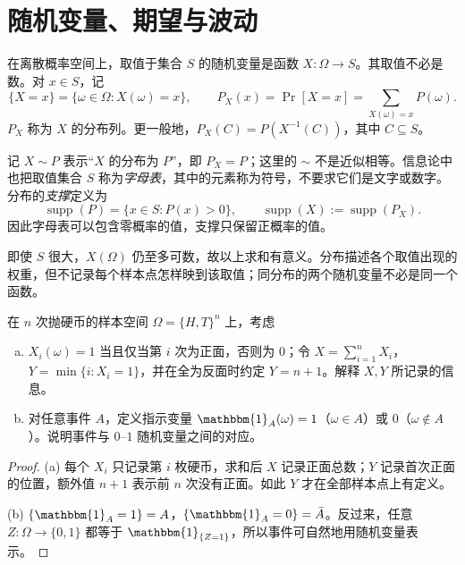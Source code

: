 \documentclass[lang=cn,a4paper,fontset=none,zihao=false,10pt,openany,twoside]{beautybook}
\numberwithin{algorithm}{chapter}
\begin{document}
\clearpage
\section{随机变量、期望与波动}\label{sec:probability-variables}
\begin{definition}[随机变量及其分布]\label{def:discrete-random-variable}
在离散概率空间上，取值于集合 $S$ 的随机变量是函数 $X:\Omega\to S$。其取值不必是数。对 $x\in S$，记
\[
 \{X=x\}=\{\omega\in\Omega:X(\omega)=x\},\qquad
 P_X(x)=\Pr[X=x]=\sum_{X(\omega)=x}P(\omega).
\]
$P_X$ 称为 $X$ 的分布列。更一般地，$P_X(C)=P(X^{-1}(C))$，其中 $C\subseteq S$。
\end{definition}
记 $X\sim P$ 表示“$X$ 的分布为 $P$”，即 $P_X=P$；这里的 $\sim$ 不是近似相等。信息论中也把取值集合 $S$ 称为\emph{字母表}，其中的元素称为符号，不要求它们是文字或数字。分布的\emph{支撑}定义为
\[
 \operatorname{supp}(P)=\{x\in S:P(x)>0\},\qquad
 \operatorname{supp}(X):=\operatorname{supp}(P_X).
\]
因此字母表可以包含零概率的值，支撑只保留正概率的值。

即使 $S$ 很大，$X(\Omega)$ 仍至多可数，故以上求和有意义。分布描述各个取值出现的权重，但不记录每个样本点怎样映到该取值；同分布的两个随机变量不必是同一个函数。

\begin{example}[抛硬币与指示变量]\label{ex:probability-coins}
在 $n$ 次抛硬币的样本空间 $\Omega=\{H,T\}^n$ 上，考虑
\begin{enumerate}[(a)]
\item $X_i(\omega)=1$ 当且仅当第 $i$ 次为正面，否则为 $0$；令 $X=\sum_{i=1}^nX_i$，$Y=\min\{i:X_i=1\}$，并在全为反面时约定 $Y=n+1$。解释 $X,Y$ 所记录的信息。
\item 对任意事件 $A$，定义指示变量 $\mathbbm{1}_A(\omega)=1$（$\omega\in A$）或 $0$（$\omega\notin A$）。说明事件与 $0$--$1$ 随机变量之间的对应。
\end{enumerate}
\end{example}
\begin{proof}
(a) 每个 $X_i$ 只记录第 $i$ 枚硬币，求和后 $X$ 记录正面总数；$Y$ 记录首次正面的位置，额外值 $n+1$ 表示前 $n$ 次没有正面。如此 $Y$ 才在全部样本点上有定义。

(b) $\{\mathbbm{1}_A=1\}=A$，$\{\mathbbm{1}_A=0\}=\bar{A}$。反过来，任意 $Z:\Omega\to\{0,1\}$ 都等于 $\mathbbm{1}_{\{Z=1\}}$，所以事件可自然地用随机变量表示。
\end{proof}
\end{document}

